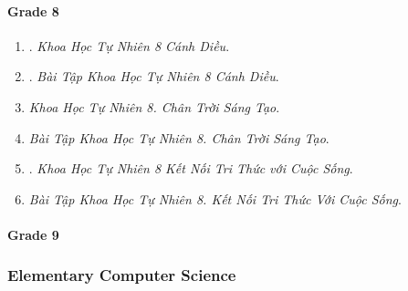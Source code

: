\documentclass{article}
\begin{document}
\paragraph{Grade 8}

\begin{enumerate}
	\item \cite{SGK_KHTN_8_Canh_Dieu}. {\it Khoa Học Tự Nhiên 8 Cánh Diều}.\hfill{\sf[done]}
	\item \cite{SBT_KHTN_8_Canh_Dieu}. {\it Bài Tập Khoa Học Tự Nhiên 8 Cánh Diều}.\hfill{\sf[done]}
	\item {\it Khoa Học Tự Nhiên 8. Chân Trời Sáng Tạo}.
	\item {\it Bài Tập Khoa Học Tự Nhiên 8. Chân Trời Sáng Tạo}.
	\item \cite{SGK_KHTN_8_KNTTVCS}. {\it Khoa Học Tự Nhiên 8 Kết Nối Tri Thức với Cuộc Sống}.\hfill{\sf[done]}
	\item {\it Bài Tập Khoa Học Tự Nhiên 8. Kết Nối Tri Thức Với Cuộc Sống}.
\end{enumerate}

\paragraph{Grade 9}

\subsubsection{Elementary Computer Science}
\end{document}
